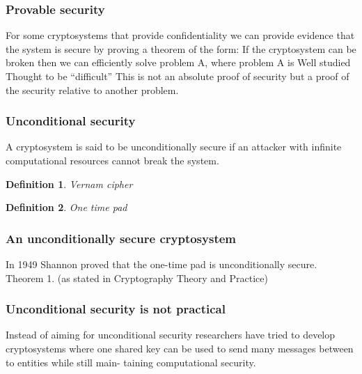 \documentclass{article}
\theoremstyle{quest}
\newtheorem*{definition}{Definition}
\begin{document}
\subsubsection{Provable security}
For some cryptosystems that provide confidentiality we can provide evidence that the system is secure by proving a theorem of the form:
If the cryptosystem can be broken then we can efficiently solve problem A, where problem A is
 Well studied
 Thought to be “difficult”
This is not an absolute proof of security but a proof of the security relative to another problem.

\subsubsection{Unconditional security}
A cryptosystem is said to be unconditionally secure if an attacker with infinite computational resources cannot break the system.

\begin{definition}
	\textit{Vernam cipher}
\end{definition}

\begin{definition}
	\textit{One time pad}
\end{definition}

\subsubsection{An unconditionally secure cryptosystem}
In 1949 Shannon proved that the one-time pad is unconditionally secure.
Theorem 1.
(as stated in Cryptography Theory and Practice)

\subsubsection{Unconditional security is not practical}

Instead of aiming for unconditional security researchers have tried to develop cryptosystems where one shared key can be used to send many messages between to entities while still main- taining computational security.

\pagebreak


\pagebreak

\end{document}
